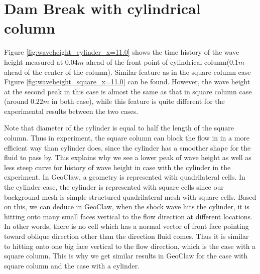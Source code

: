 \documentclass[11pt]{article}
\begin{document}
\section{Dam Break with cylindrical column}\label{Sec:Cylinder}
Figure \ref{fig:waveheight_cylinder_x=11.0} shows the time history of the wave height measured at $0.04m$ ahead of the front point of cylindrical column($0.1m$ ahead of the center of the column).
Similar feature as in the square column case Figure \ref{fig:waveheight_square_x=11.0} can be found.
However, the wave height at the second peak in this case is almost the same as that in square column case (around $0.22m$ in both case), while this feature is quite different for the experimental results between the two cases.
\par
Note that diameter of the cylinder is equal to half the length of the square column. 
Thus in experiment, the square column can block the flow in in a more efficient way than cylinder does, since the cylinder has a smoother shape for the fluid to pass by. 
This explains why we see a lower peak of wave height as well as less steep curve for history of wave height in case with the cylinder in the experiment. 
In GeoClaw, a geometry is represented with quadrilateral cells. 
In the cylinder case, the cylinder is represented with square cells since our background mesh is simple structured quadrilateral mesh with square cells.
Based on this, we can deduce in GeoClaw, when the shock wave hits the cylinder, it is hitting onto many small faces vertical to the flow direction at different locations. 
In other words, there is no cell which has a normal vector of front face pointing toward oblique direction other than the direction fluid comes.  
Thus it is similar to hitting onto one big face vertical to the flow direction, which is the case with a square column.  
This is why we get similar results in GeoClaw for the case with square column and the case with a cylinder.
\end{document}
